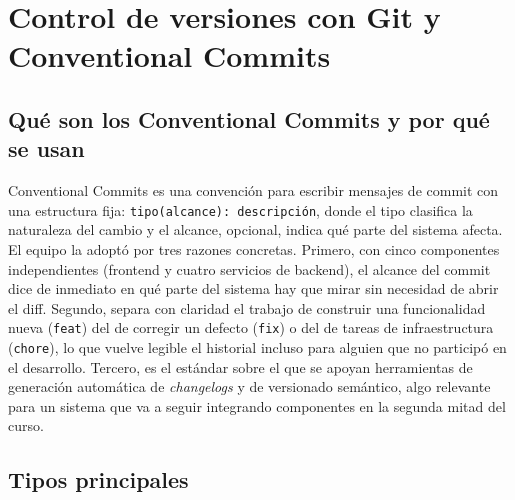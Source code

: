 \documentclass[12pt,a4paper]{article}
\begin{document}
\section{Control de versiones con Git y Conventional Commits}
\label{sec:git}

\subsection{Qué son los Conventional Commits y por qué se usan}

Conventional Commits es una convención para escribir mensajes de commit con una estructura fija:
\texttt{tipo(alcance): descripción}, donde el tipo clasifica la naturaleza del cambio y el alcance,
opcional, indica qué parte del sistema afecta. El equipo la adoptó por tres razones concretas.
Primero, con cinco componentes independientes (frontend y cuatro servicios de backend), el alcance
del commit dice de inmediato en qué parte del sistema hay que mirar sin necesidad de abrir el
diff. Segundo, separa con claridad el trabajo de construir una funcionalidad nueva (\texttt{feat})
del de corregir un defecto (\texttt{fix}) o del de tareas de infraestructura
(\texttt{chore}), lo que vuelve legible el historial incluso para alguien que no participó en el
desarrollo. Tercero, es el estándar sobre el que se apoyan herramientas de generación automática de
\textit{changelogs} y de versionado semántico, algo relevante para un sistema que va a seguir
integrando componentes en la segunda mitad del curso.

\subsection{Tipos principales}
\end{document}
